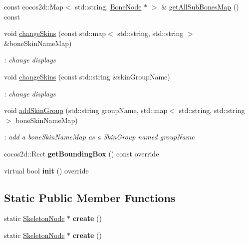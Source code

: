 \begin{DoxyCompactItemize}
\item 
const cocos2d\+::\+Map$<$ std\+::string, \hyperlink{classBoneNode}{Bone\+Node} $\ast$ $>$ \& \hyperlink{classSkeletonNode_a68cea338754560eb3bb53e0120ab357f}{get\+All\+Sub\+Bones\+Map} () const
\item 
void \hyperlink{classSkeletonNode_a29dd03517b18a7d12f50542ddf3f42f2}{change\+Skins} (const std\+::map$<$ std\+::string, std\+::string $>$ \&bone\+Skin\+Name\+Map)
\begin{DoxyCompactList}\small\item\em \+: change displays \end{DoxyCompactList}\item 
void \hyperlink{classSkeletonNode_af9f13ad397a5d190500224d2ab510324}{change\+Skins} (const std\+::string \&skin\+Group\+Name)
\begin{DoxyCompactList}\small\item\em \+: change displays \end{DoxyCompactList}\item 
void \hyperlink{classSkeletonNode_ae4cfa9a616beff4fac44faca5bced45b}{add\+Skin\+Group} (std\+::string group\+Name, std\+::map$<$ std\+::string, std\+::string $>$ bone\+Skin\+Name\+Map)
\begin{DoxyCompactList}\small\item\em \+: add a bone\+Skin\+Name\+Map as a Skin\+Group named group\+Name \end{DoxyCompactList}\item 
\mbox{\label{classSkeletonNode_ac70f988a43f624a68e6006eabe176f18}} 
cocos2d\+::\+Rect {\bfseries get\+Bounding\+Box} () const override
\item 
\mbox{\label{classSkeletonNode_ae1088776c3aa96e3fff481f776504b2c}} 
virtual bool {\bfseries init} () override
\end{DoxyCompactItemize}
\subsection*{Static Public Member Functions}
\begin{DoxyCompactItemize}
\item 
\mbox{\label{classSkeletonNode_a023b8e8f06eeaa507db897d61a85d12a}} 
static \hyperlink{classSkeletonNode}{Skeleton\+Node} $\ast$ {\bfseries create} ()
\item 
\mbox{\label{classSkeletonNode_a754d998907e95411c99f109c8d7d7466}} 
static \hyperlink{classSkeletonNode}{Skeleton\+Node} $\ast$ {\bfseries create} ()
\end{DoxyCompactItemize}
